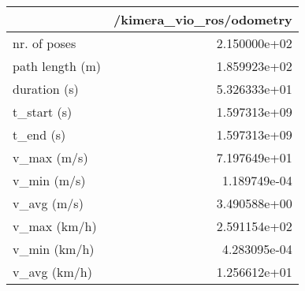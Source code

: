 \begin{tabular}{lr}
\toprule
{} &  /kimera\_vio\_ros/odometry \\
\midrule
nr. of poses    &              2.150000e+02 \\
path length (m) &              1.859923e+02 \\
duration (s)    &              5.326333e+01 \\
t\_start (s)     &              1.597313e+09 \\
t\_end (s)       &              1.597313e+09 \\
v\_max (m/s)     &              7.197649e+01 \\
v\_min (m/s)     &              1.189749e-04 \\
v\_avg (m/s)     &              3.490588e+00 \\
v\_max (km/h)    &              2.591154e+02 \\
v\_min (km/h)    &              4.283095e-04 \\
v\_avg (km/h)    &              1.256612e+01 \\
\bottomrule
\end{tabular}
